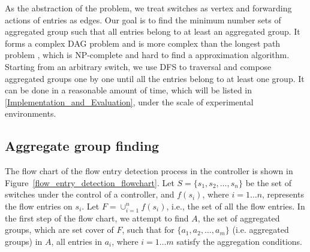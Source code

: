 As the abstraction of the problem, we treat switches as vertex and forwarding actions of entries as edges. Our goal is to find the minimum number sets of aggregated group such that all entries belong to at least an aggregated group. It forms a complex DAG problem and is more complex than the longest path problem \cite{DMR97,RU04}, which is NP-complete and hard to find a approximation algorithm. Starting from an arbitrary switch, we use DFS to traversal and compose aggregated groups one by one until all the entries belong to at least one group. It can be done in a reasonable amount of time, which will be listed in \ref{Implementation_and_Evaluation}, under the scale of experimental environments.

\subsection{Aggregate group finding}
\label{Aggregated_group_finding}

The flow chart of the flow entry detection process in the controller is shown in Figure~\ref{flow_entry_detection_flowchart}. Let $S=\{s_1,s_2,\ldots,s_n\}$ be the set of switches under the control of a controller, and $f(s_i)$, where $i=1\ldots n$, represents the flow entries on $s_i$. Let $F=\cup_{i=1}^n f(s_i)$, i.e., the set of all the flow entries. In the first step of the flow chart, we attempt to find $A$, the set of aggregated groups, which are set cover of $F$, such that for $\{a_1, a_2, \ldots, a_m\}$ (i.e. aggregated groups) in $A$, all entries in $a_i$, where $i=1\ldots m$ satisfy the aggregation conditions.

